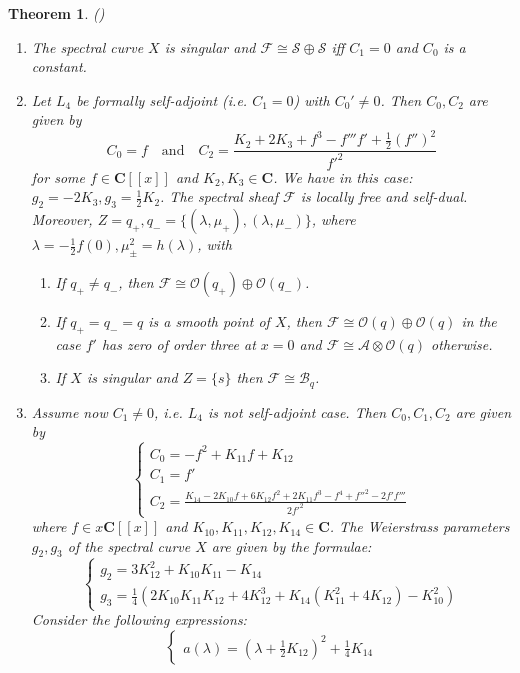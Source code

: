 \documentclass[11pt]{article}
\theoremstyle{definition}
\theoremstyle{plain}
\newtheorem{theorem}{Theorem}[section]
\numberwithin{equation}{section}
\begin{document}
\begin{theorem}{(\cite[Summary]{BZ})}
	\label{T:Rank 2 sheaves}
	
\begin{enumerate}
		\item The spectral curve $X$ is singular and $\mathcal{F}\cong \mathcal{S}\oplus \mathcal{S}$ iff $C_1=0$ and $C_0$ is a constant.
		\item Let $L_4$ be formally self-adjoint (i.e. $C_1=0$) with $C_0'\neq 0$. Then $C_0,C_2$ are given by 
		$$
		C_0=f\quad\text{and} \quad C_2=\frac{K_2+2K_3+f^3-f'''f'+\frac{1}{2}(f'')^2}{f'^2}
		$$
		for some $f\in \mathbf{C}[[x]]$ and $K_2,K_3\in \mathbf{C}$. We have in this case: $g_2=-2K_3,g_3=\frac{1}{2}K_2$. The spectral sheaf $\mathcal{F}$ is locally free and self-dual. Moreover, $Z={q_+,q_-}=\{(\lambda,\mu_+),(\lambda,\mu_-)\}$, where $\lambda=-\frac{1}{2}f(0),\mu_{\pm}^2=h(\lambda)$, with 
		\begin{enumerate}
			\item[(1)] If $q_+\neq q_-$, then $\mathcal{F}\cong \mathcal{O}(q_+)\oplus\mathcal{O}(q_-)$. 
			\item[(2)] If $q_+= q_-=q$ is a smooth point of $X$, then $\mathcal{F}\cong \mathcal{O}(q)\oplus \mathcal{O}(q)$ in the case $f'$ has zero of order three at $x=0$ and $\mathcal{F}\cong \mathcal{A}\otimes \mathcal{O}(q)$ otherwise.
			\item[(3)] If $X$ is singular and $Z=\{s\}$ then $\mathcal{F}\cong \mathcal{B}_q$.
		\end{enumerate}
		\item Assume now $C_1\neq 0$, i.e. $L_4$ is not self-adjoint case. Then $C_0,C_1,C_2$ are given by 
		$$\begin{cases}
			C_0=-f^2+K_{11}f+K_{12}
			\\C_1=f'
			\\C_2=\frac{K_{14}-2K_{10}f+6K_{12}f^2+2K_{11}f^3-f^4+f''^2-2f'f'''}{2f'^2}
		\end{cases}$$
		where $f\in x\mathbf{C}[[x]]$ and $K_{10},K_{11},K_{12},K_{14}\in \mathbf{C}$. The Weierstrass parameters $g_2,g_3$ of the spectral curve $X$ are given by the formulae:
		$$
		\begin{cases}
			g_2=3K_{12}^2+K_{10}K_{11}-K_{14}
			\\g_3=\frac{1}{4}(2K_{10}K_{11}K_{12}+4K_{12}^3+K_{14}(K_{11}^2+4K_12)-K_{10}^2)
		\end{cases}
		$$
		Consider the following expressions:
		$$
		\begin{cases}
			a(\lambda)=(\lambda+\frac{1}{2}K_{12})^2+\frac{1}{4}K_{14}

\end{cases}$$
\end{enumerate}
\end{theorem}
\end{document}
